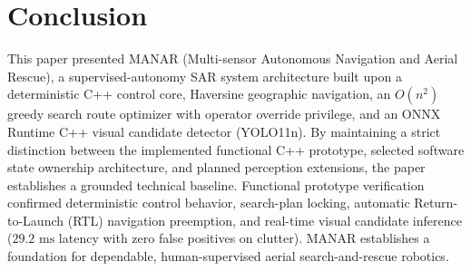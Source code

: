 \section{Conclusion}

This paper presented MANAR (Multi-sensor Autonomous Navigation and Aerial Rescue), a supervised-autonomy SAR system architecture built upon a deterministic C++ control core, Haversine geographic navigation, an $O(n^2)$ greedy search route optimizer with operator override privilege, and an ONNX Runtime C++ visual candidate detector (YOLO11n). By maintaining a strict distinction between the implemented functional C++ prototype, selected software state ownership architecture, and planned perception extensions, the paper establishes a grounded technical baseline. Functional prototype verification confirmed deterministic control behavior, search-plan locking, automatic Return-to-Launch (RTL) navigation preemption, and real-time visual candidate inference ($29.2\text{ ms}$ latency with zero false positives on clutter). MANAR establishes a foundation for dependable, human-supervised aerial search-and-rescue robotics.
